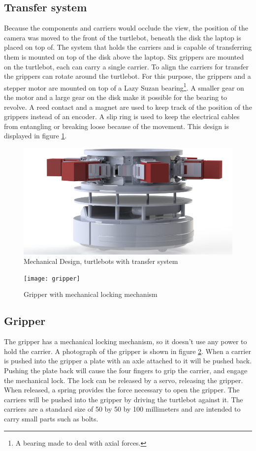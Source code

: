 \documentclass[10pt, journal]{IEEEtran}
\begin{document}
\subsection{Transfer system}
Because the components and carriers would occlude the view, the position of the camera was moved to the front of the turtlebot, beneath the disk the laptop is placed on top of. The system that holds the carriers and is capable of transferring them is mounted on top of the disk above the laptop. Six grippers are mounted on the turtlebot, each can carry a single carrier. To align the carriers for transfer the grippers can rotate around the turtlebot. For this purpose, the grippers and a stepper motor are mounted on top of a Lazy Suzan bearing\footnote{A bearing made to deal with axial forces.}. A smaller gear on the motor and a large gear on the disk make it possible for the bearing to revolve. A reed contact and a magnet are used to keep track of the position of the grippers instead of an encoder. A slip ring is used to keep the electrical cables from entangling or breaking loose because of the movement. This design is displayed in figure \ref{MechanicalDesign}.
\begin{figure}[htp]
\centering
\includegraphics[width=\columnwidth]{turtle_design}
\caption{Mechanical Design, turtlebots with transfer system}
\label{MechanicalDesign}
\end{figure}
\begin{figure}[htp]
\centering
\texttt{[image: gripper]}
\caption{Gripper with mechanical locking mechanism}
\label{Gripper}
\end{figure}

\subsection{Gripper}
The gripper has a mechanical locking mechanism, so it doesn’t use any power to hold the carrier. A photograph of the gripper is shown in figure \ref{Gripper}. When a carrier is pushed into the gripper a plate with an axle attached to it will be pushed back. Pushing the plate back will cause the four fingers to grip the carrier, and engage the mechanical lock. The lock can be released by a servo, releasing the gripper. When released, a spring provides the force necessary to open the gripper. The carriers will be pushed into the gripper by driving the turtlebot against it. 
The carriers are a standard size of 50 by 50 by 100 millimeters and are intended to carry small parts such as bolts. 
\end{document}
